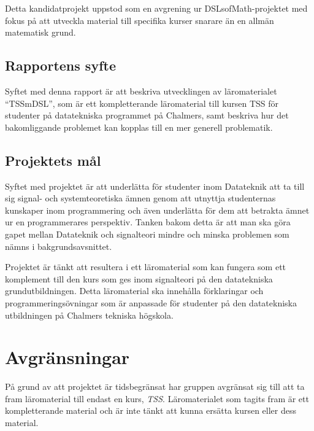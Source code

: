 \documentclass[12pt,a4paper,twoside,openright]{article}
\begin{document}
Detta kandidatprojekt uppstod som en avgrening ur DSLsofMath-projektet med fokus
på att utveckla material till specifika kurser snarare än en allmän matematisk grund.

\subsection{Rapportens syfte}


Syftet med denna rapport är att beskriva utvecklingen av läromaterialet
``\gls{TSSmDSL}'', som är ett kompletterande läromaterial till kursen TSS
för studenter på datatekniska programmet på Chalmers, samt beskriva hur det
bakomliggande problemet kan kopplas till en mer generell problematik.

\subsection{Projektets mål}
Syftet med projektet är att underlätta för studenter inom Datateknik att
ta till sig signal- och systemteoretiska ämnen genom att utnyttja studenternas
kunskaper inom programmering och även underlätta för dem att betrakta
ämnet ur en programmerares perspektiv. Tanken bakom detta är att man ska göra
gapet mellan Datateknik och signalteori mindre och minska problemen som nämns
i bakgrundsavsnittet.

Projektet är tänkt att resultera i ett läromaterial som kan fungera som ett
komplement till den kurs som ges inom signalteori på den datatekniska
grund\-utbildningen. Detta läromaterial ska innehålla förklaringar och
programmeringsövningar som är anpassade för studenter på den datatekniska
utbildningen på Chalmers tekniska högskola.

\section{Avgränsningar}

På grund av att projektet är tidsbegränsat har gruppen avgränsat sig till att ta fram
läromaterial till endast en kurs, \textit{TSS}. Läromaterialet som tagits fram är ett
kompletterande material och är inte tänkt att kunna ersätta kursen eller
dess material.
\end{document}
